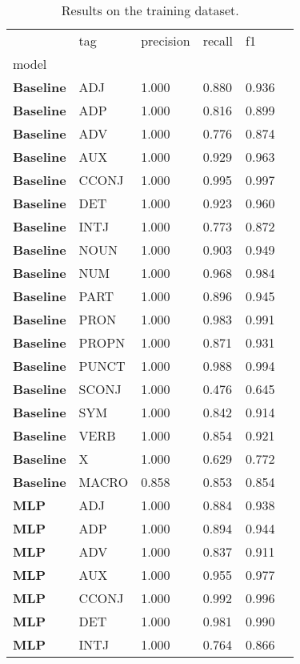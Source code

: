 \begin{table}
\caption{Results on the training dataset.}
\label{tab::ex_10_train}
\begin{tabular}{|l|l|l|l|l|l|}
\toprule
 & tag & precision & recall & f1 \\
model &  &  &  &  \\
\midrule
\textbf{Baseline} & ADJ & 1.000 & 0.880 & 0.936 \\
\textbf{Baseline} & ADP & 1.000 & 0.816 & 0.899 \\
\textbf{Baseline} & ADV & 1.000 & 0.776 & 0.874 \\
\textbf{Baseline} & AUX & 1.000 & 0.929 & 0.963 \\
\textbf{Baseline} & CCONJ & 1.000 & 0.995 & 0.997 \\
\textbf{Baseline} & DET & 1.000 & 0.923 & 0.960 \\
\textbf{Baseline} & INTJ & 1.000 & 0.773 & 0.872 \\
\textbf{Baseline} & NOUN & 1.000 & 0.903 & 0.949 \\
\textbf{Baseline} & NUM & 1.000 & 0.968 & 0.984 \\
\textbf{Baseline} & PART & 1.000 & 0.896 & 0.945 \\
\textbf{Baseline} & PRON & 1.000 & 0.983 & 0.991 \\
\textbf{Baseline} & PROPN & 1.000 & 0.871 & 0.931 \\
\textbf{Baseline} & PUNCT & 1.000 & 0.988 & 0.994 \\
\textbf{Baseline} & SCONJ & 1.000 & 0.476 & 0.645 \\
\textbf{Baseline} & SYM & 1.000 & 0.842 & 0.914 \\
\textbf{Baseline} & VERB & 1.000 & 0.854 & 0.921 \\
\textbf{Baseline} & X & 1.000 & 0.629 & 0.772 \\
\textbf{Baseline} & MACRO & 0.858 & 0.853 & 0.854 \\
\textbf{MLP} & ADJ & 1.000 & 0.884 & 0.938 \\
\textbf{MLP} & ADP & 1.000 & 0.894 & 0.944 \\
\textbf{MLP} & ADV & 1.000 & 0.837 & 0.911 \\
\textbf{MLP} & AUX & 1.000 & 0.955 & 0.977 \\
\textbf{MLP} & CCONJ & 1.000 & 0.992 & 0.996 \\
\textbf{MLP} & DET & 1.000 & 0.981 & 0.990 \\
\textbf{MLP} & INTJ & 1.000 & 0.764 & 0.866 \\

\end{tabular}
\end{table}
